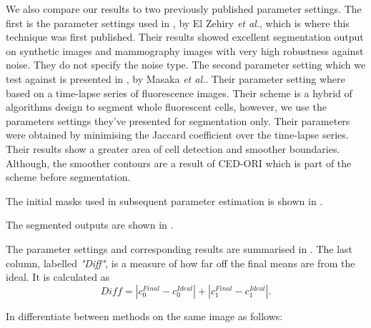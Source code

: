 We also compare our results  to two previously published parameter settings.
The first is the parameter settings used in \citep{ElZehiry2007}, by El Zehiry \textit{et al.}, which is where this technique was first published. Their results showed excellent segmentation output on synthetic images and mammography images with very high robustness against noise. They do not specify the noise type.
The second parameter setting which we test against is presented in \citep{Maska2013}, by Masaka \textit{et al.}. Their parameter setting where based on a time-lapse series of fluorescence images. Their scheme is a hybrid of algorithms design to segment whole fluorescent cells, however, we use the parameters settings they've presented for segmentation only. Their parameters were obtained by minimising the Jaccard coefficient over the time-lapse series. Their results show a greater area of cell detection and smoother boundaries. Although, the smoother contours are a result of CED-ORI \citep{Weickert2002} which is part of the scheme before segmentation.

The initial masks used in subsequent parameter estimation is shown in .

The segmented outputs are shown in .

The parameter settings and corresponding results are summarised in . The last column, labelled \textit{"Diff"}, is a measure of how far off the final means are from the ideal. It is calculated as 
\begin{equation*}
	Diff = |c_{0}^{Final}-c_{0}^{Ideal}| + |c_{1}^{Final}-c_{1}^{Ideal}|.
\end{equation*}

In  differentiate between methods on the same image as follows:


